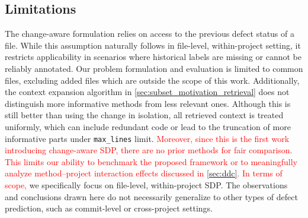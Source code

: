 \documentclass[authoryear,final,5p,times,twocolumn]{elsarticle}
\theoremstyle{plain}
\begin{document}
\begin{table}[!htbp]
\centering
\caption{\textcolor{red}{Computational cost breakdown of MAD framework. Values are reported as mean $\pm$ 95\% confidence interval and represent the average value per file. Tok/s (tokens per second) denotes the effective generation throughput, computed as the total number of output tokens divided by the runtime.}}
\label{tab:mad_cost}
\renewcommand{\arraystretch}{1.3}
\setlength{\tabcolsep}{10pt}
\end{table}

\subsection{Limitations}
The change-aware formulation relies on access to the previous defect status of a file. While this assumption naturally follows in file-level, within-project setting, it restricts applicability in scenarios where historical labels are missing or cannot be reliably annotated. 
Our problem formulation and evaluation is limited to common files, excluding added files which are outside the scope of this work. Additionally, the context expansion algorithm in \autoref{sec:subset_motivation_retrieval} does not distinguish more informative methods from less relevant ones.
Although this is still better than using the change in isolation, all retrieved context is treated uniformly, which can include redundant code or lead to the truncation of more informative parts under \texttt{max\_lines} limit.
\textcolor{red}{Moreover, since this is the first work introducing change-aware SDP, there are no prior methods for fair comparison. This limits our ability to benchmark the proposed framework or to meaningfully analyze method–project interaction effects discussed in \autoref{sec:ddc}.}
\textcolor{red}{In terms of scope,} we specifically focus on file-level, within-project SDP. The observations and conclusions drawn here do not necessarily generalize to other types of defect prediction, such as commit-level or cross-project settings.
\end{document}
